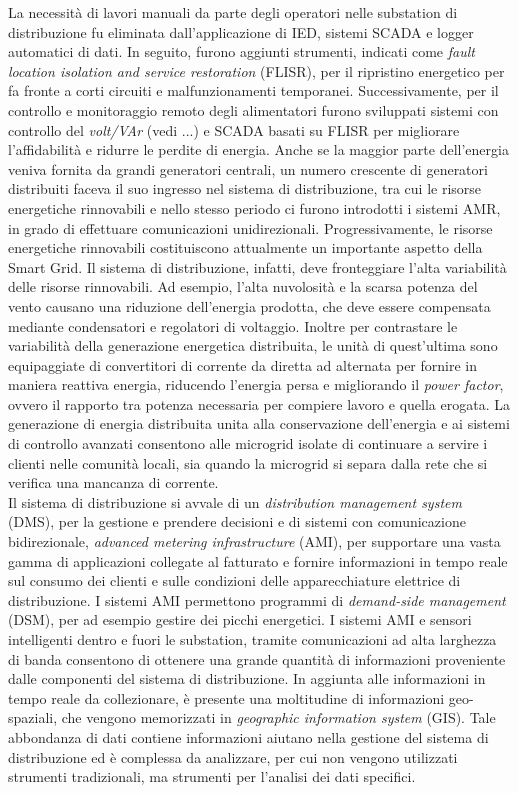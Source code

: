 La necessità di lavori manuali da parte degli operatori nelle substation di distribuzione fu eliminata dall'applicazione di IED, sistemi SCADA e logger automatici di dati. In seguito, furono aggiunti strumenti, indicati come \emph{fault location isolation and service restoration} (FLISR), per il ripristino energetico per fa fronte a corti circuiti e malfunzionamenti temporanei. Successivamente,  per il controllo e monitoraggio remoto degli alimentatori furono sviluppati sistemi con controllo del \emph{volt/VAr} (vedi ...) e SCADA basati su FLISR per migliorare l'affidabilità e ridurre le perdite di energia. Anche se la maggior parte dell'energia veniva fornita da grandi generatori centrali, un numero crescente di generatori distribuiti faceva il suo ingresso nel sistema di distribuzione, tra cui le risorse energetiche rinnovabili e nello stesso periodo ci furono introdotti i sistemi AMR, in grado di effettuare comunicazioni unidirezionali. Progressivamente, le risorse energetiche rinnovabili costituiscono attualmente un importante aspetto della Smart Grid. Il sistema di distribuzione, infatti, deve fronteggiare l'alta variabilità delle risorse rinnovabili. Ad esempio, l'alta nuvolosità e la scarsa potenza del vento causano una riduzione dell'energia prodotta, che deve essere compensata mediante condensatori e regolatori di voltaggio. Inoltre per contrastare le variabilità della generazione energetica distribuita, le unità di quest'ultima sono equipaggiate di convertitori di corrente da diretta ad alternata per fornire in maniera reattiva energia, riducendo l'energia persa e migliorando il \emph{power factor}, ovvero il rapporto tra potenza necessaria per compiere lavoro e quella erogata. La generazione di energia distribuita unita alla conservazione dell'energia e ai sistemi di controllo avanzati consentono alle microgrid isolate di continuare a servire i clienti nelle comunità locali, sia quando la microgrid si separa dalla rete che si verifica una mancanza di corrente. 
\\ 
Il sistema di distribuzione si avvale di un \emph{distribution management system} (DMS), per la gestione e prendere decisioni e di sistemi con comunicazione bidirezionale, \emph{advanced metering infrastructure} (AMI), per supportare una vasta gamma di applicazioni collegate al fatturato e fornire informazioni in tempo reale sul consumo dei clienti e sulle condizioni delle apparecchiature elettrice di distribuzione. I sistemi AMI permettono programmi di \emph{demand-side management} (DSM), per ad esempio gestire dei picchi energetici. I sistemi AMI e sensori intelligenti dentro e fuori le substation, tramite comunicazioni ad alta larghezza di banda consentono di ottenere una grande quantità di informazioni proveniente dalle componenti del sistema di distribuzione. In aggiunta alle informazioni in tempo reale da collezionare, è presente una moltitudine di informazioni geo-spaziali, che vengono memorizzati in \emph{geographic information system} (GIS). Tale abbondanza di dati contiene informazioni aiutano nella gestione del sistema di distribuzione ed è complessa da analizzare, per cui non vengono utilizzati strumenti tradizionali, ma strumenti per l'analisi dei dati specifici.    
 



